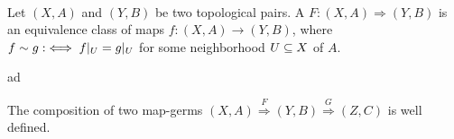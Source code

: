 
 \\
Let $(X, A)$ and $(Y, B)$ be two topological pairs.
A  $F: (X, A) \Rightarrow (Y, B)$ is an equivalence class of maps $f: (X, A) \to (Y, B)$, where
$f \sim g :\iff f\vert_{U} = g\vert_{U}$ for some neighborhood $U \subseteq{} X$ of $A$. 

ad

\begin{remark}
The composition of two map-germs $(X, A) \overset{F}{\Rightarrow} (Y, B) \overset{G}{\Rightarrow} (Z, C)$ is well defined.
\end{remark}